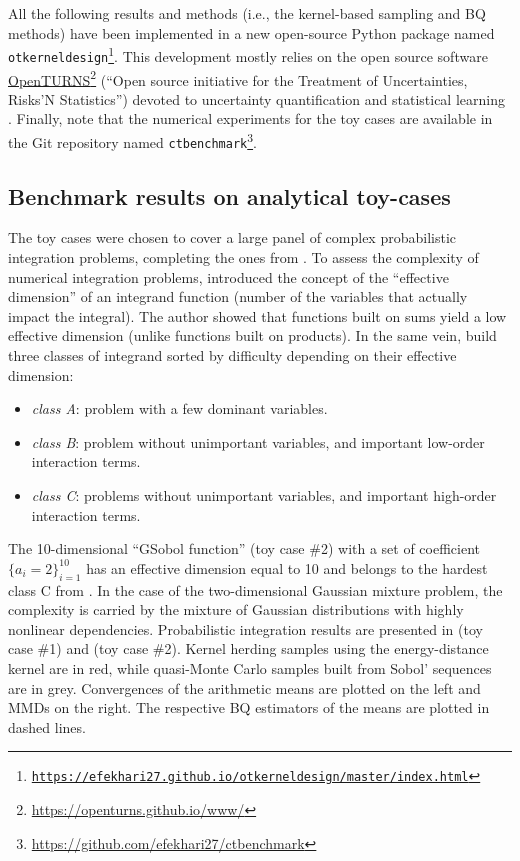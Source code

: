 All the following results and methods (i.e., the kernel-based sampling and BQ methods) have been implemented in a new open-source Python package named \texttt{otkerneldesign\footnote{\href{https://efekhari27.github.io/otkerneldesign/master/index.html}{https://efekhari27.github.io/otkerneldesign/master/index.html}}}. 
This development mostly relies on the open source software \href{https://openturns.github.io/www/}{OpenTURNS}\footnote{\url{https://openturns.github.io/www/}} (``Open source initiative for the Treatment of Uncertainties, Risks'N Statistics'') devoted to uncertainty quantification and statistical learning \citep{baudin_dutfoy_2017}. 
Finally, note that the numerical experiments for the toy cases are available in the Git repository named \texttt{ctbenchmark}\footnote{\href{https://github.com/efekhari27/ctbenchmark}{https://github.com/efekhari27/ctbenchmark}}. 


\subsection{Benchmark results on analytical toy-cases}
The toy cases were chosen to cover a large panel of complex probabilistic integration problems, completing the ones from \cite{fekhari_renew_2022}.
To assess the complexity of numerical integration problems, \cite{owen_2003} introduced the concept of the ``effective dimension'' of an integrand function (number of the variables that actually impact the integral). 
The author showed that functions built on sums yield a low effective dimension (unlike functions built on products). 
In the same vein, \cite{kucherenko_feil_2011} build three classes of integrand sorted by difficulty depending on their effective dimension: \begin{itemize}
    \item \emph{class A}: problem with a few dominant variables.
    \item \emph{class B}: problem without unimportant variables, and important low-order interaction terms.
    \item \emph{class C}: problems without unimportant variables, and important high-order interaction terms. 
\end{itemize}
The 10-dimensional ``GSobol function'' (toy case \#2) with a set of coefficient $\{a_i=2\}_{i=1}^{10}$ has an effective dimension equal to 10 and belongs to the hardest class C from \cite{kucherenko_feil_2011}. 
In the case of the two-dimensional Gaussian mixture problem, the complexity is carried by the mixture of Gaussian distributions with highly nonlinear dependencies.
Probabilistic integration results are presented in  (toy case \#1) and  (toy case \#2). 
Kernel herding samples using the energy-distance kernel are in red, while quasi-Monte Carlo samples built from Sobol' sequences are in grey. 
Convergences of the arithmetic means are plotted on the left and MMDs on the right. 
The respective BQ estimators of the means are plotted in dashed lines. 

